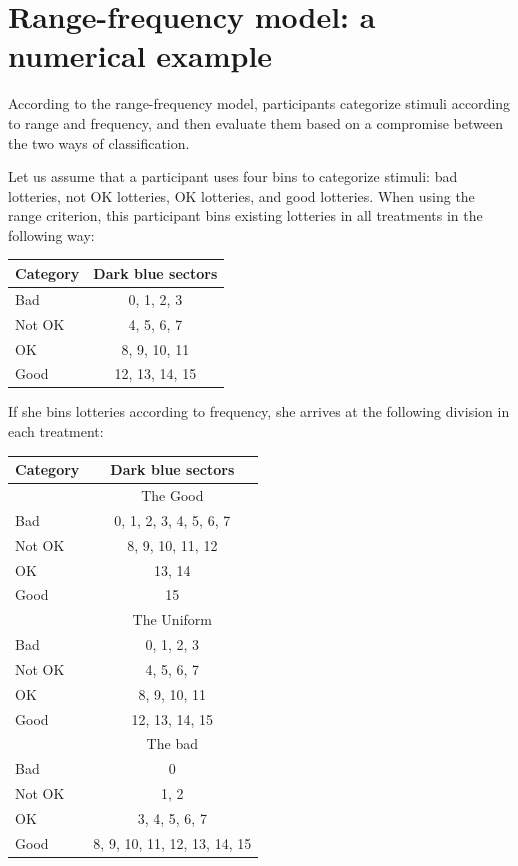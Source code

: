 \documentclass[pdftex,12pt, a4paper]{article}
\begin{document}
\newpage
\section{Range-frequency model: a numerical example}
\label{section:appendixb}
\setcounter{figure}{0}
\setcounter{table}{0}
\renewcommand{\thefigure}{B.\arabic{figure}}
\renewcommand{\thetable}{B.\arabic{table}}
According to the range-frequency model, participants categorize stimuli according to range and frequency, and then evaluate them based on a compromise between the two ways of classification.

Let us assume that a participant uses four bins to categorize stimuli: bad lotteries, not OK lotteries, OK lotteries, and good lotteries.
When using the range criterion, this participant bins existing lotteries in all treatments in the following way:
\begin{center}
\begin{tabular}{p{3cm} c}
Category & Dark blue sectors \\
\hline
Bad & 0, 1, 2, 3\\
Not OK & 4, 5, 6, 7\\
OK & 8, 9, 10, 11\\
Good & 12, 13, 14, 15\\
\hline
\end{tabular}
\end{center}

If she bins lotteries according to frequency, she arrives at the following division in each treatment:
\begin{center}
\begin{tabular}{p{3cm} c}
Category & Dark blue sectors \\
\hline
& The Good \\
\cmidrule{2-2}
Bad & 0, 1, 2, 3, 4, 5, 6, 7\\
Not OK & 8, 9, 10, 11, 12\\
OK & 13, 14\\
Good & 15\\
\cmidrule{2-2}
& The Uniform \\
\cmidrule{2-2}
Bad & 0, 1, 2, 3\\
Not OK & 4, 5, 6, 7\\
OK & 8, 9, 10, 11\\
Good & 12, 13, 14, 15\\
\cmidrule{2-2}
& The bad \\
\cmidrule{2-2}
Bad & 0\\
Not OK & 1, 2\\
OK & 3, 4, 5, 6, 7\\
Good & 8, 9, 10, 11, 12, 13, 14, 15\\
\hline
\end{tabular}
\end{center}
\end{document}

